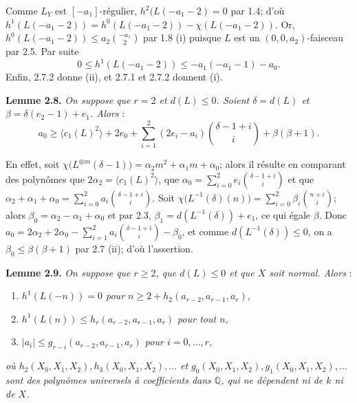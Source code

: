 Comme \(L_Y\) est \([-a_1]\)-régulier, \(h^2(L(-a_1-2)=0\) par 1.4; d'où \(h^1(L(-a_1-2))=h^0(L(-a_1-2))-\chi(L(-a_1-2))\). Or, \(h^0(L(-a_1-2))\le a_2\binom{-a_1}{2}\) par 1.8 (i) puisque \(L\) est un \((0,0,a_2)\)-faisceau par 2.5. Par suite
\[
0\le h^1(L(-a_1-2))\le -a_1(-a_1-1)-a_0.
\tag{2.7.2}
\]
Enfin, 2.7.2 donne (ii), et 2.7.1 et 2.7.2 donnent (i).

\textbf{Lemme 2.8.} \emph{On suppose que \(r=2\) et \(d(L)\le0\). Soient \(\delta=d(L)\) et \(\beta=\delta(e_2-1)+e_1\). Alors} :
\[
a_0\ge
\langle c_1(L)^2\rangle+2e_0+
\sum_{i=1}^{2}(2e_i-a_i)\binom{\delta-1+i}{i}
+\beta(\beta+1).
\]

En effet, soit \(\chi\bigl(L^{\otimes m}(\delta-1)\bigr)=\alpha_2m^2+\alpha_1m+\alpha_0\); alors il résulte en comparant des polynômes que \(2\alpha_2=\langle c_1(L)^2\rangle\), que \(\alpha_0=\sum_{i=0}^{2}e_i\binom{\delta-1+i}{i}\) et que \(\alpha_2+\alpha_1+\alpha_0=\sum_{i=0}^{2}a_i\binom{\delta-1+i}{i}\). Soit \(\chi\bigl(L^{-1}(\delta)(n)\bigr)=\sum_{i=0}^{2}\beta_i\binom{n+i}{i}\); alors \(\beta_0=\alpha_2-\alpha_1+\alpha_0\) et par 2.3, \(\beta_1=d(L^{-1}(\delta))+e_1\), ce qui égale \(\beta\). Donc \(a_0=2\alpha_2+2\alpha_0-\sum_{i=1}^{2}a_i\binom{\delta-1+i}{i}-\beta_0\), et comme \(d(L^{-1}(\delta))\le0\), on a \(\beta_0\le\beta(\beta+1)\) par 2.7 (ii); d'où l'assertion.

\textbf{Lemme 2.9.} \emph{On suppose que \(r\ge2\), que \(d(L)\le0\) et que \(X\) soit normal. Alors} :
\begin{enumerate}[label=(\roman*)]
\item \emph{\(h^1(L(-n))=0\) pour \(n\ge2+h_2(a_{r-2},a_{r-1},a_r)\),}
\item \emph{\(h^1(L(n))\le h_r(a_{r-2},a_{r-1},a_r)\) pour tout \(n\),}
\item \emph{\(|a_i|\le g_{r-i}(a_{r-2},a_{r-1},a_r)\) pour \(i=0,\ldots,r\),}
\end{enumerate}
\emph{où \(h_2(X_0,X_1,X_2),h_3(X_0,X_1,X_2),\ldots\) et \(g_0(X_0,X_1,X_2),g_1(X_0,X_1,X_2),\ldots\) sont des polynômes universels à coefficients dans \(\mathbb Q\), qui ne dépendent ni de \(k\) ni de \(X\).}

